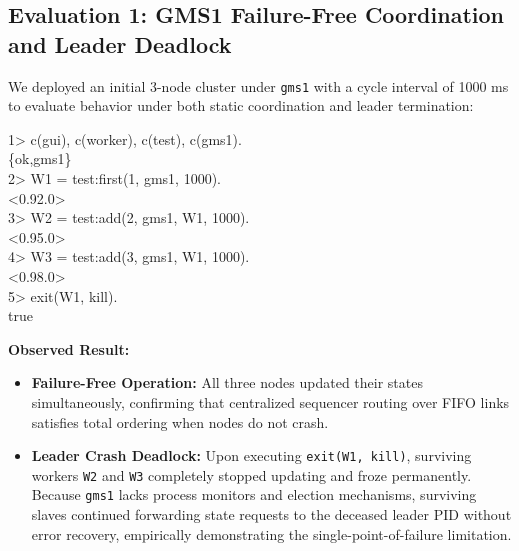 \documentclass[a4paper, 11pt]{article}
\begin{document}
\subsection{Evaluation 1: GMS1 Failure-Free Coordination and Leader Deadlock}
We deployed an initial 3-node cluster under \texttt{gms1} with a cycle interval of 1000 ms to evaluate behavior under both static coordination and leader termination:
\begin{tcolorbox}[terminalbox]
1> c(gui), c(worker), c(test), c(gms1). \\
\{ok,gms1\} \\
2> W1 = test:first(1, gms1, 1000). \\
<0.92.0> \\
3> W2 = test:add(2, gms1, W1, 1000). \\
<0.95.0> \\
4> W3 = test:add(3, gms1, W1, 1000). \\
<0.98.0> \\
5> exit(W1, kill). \\
true
\end{tcolorbox}
\textbf{Observed Result:} 
\begin{itemize}
    \item \textbf{Failure-Free Operation:} All three nodes updated their states simultaneously, confirming that centralized sequencer routing over FIFO links satisfies total ordering when nodes do not crash.
    \item \textbf{Leader Crash Deadlock:} Upon executing \texttt{exit(W1, kill)}, surviving workers \texttt{W2} and \texttt{W3} completely stopped updating and froze permanently. Because \texttt{gms1} lacks process monitors and election mechanisms, surviving slaves continued forwarding state requests to the deceased leader PID without error recovery, empirically demonstrating the single-point-of-failure limitation.
\end{itemize}
\end{document}
